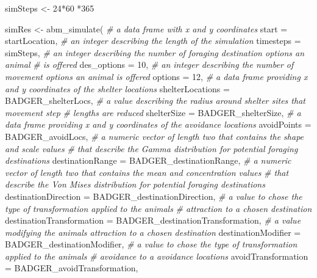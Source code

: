 \documentclass[10pt,a4paper]{article}
\newenvironment{Shaded}{}{}
\newcommand{\AttributeTok}[1]{#1}
\newcommand{\CommentTok}[1]{\textit{#1}}
\newcommand{\DecValTok}[1]{#1}
\newcommand{\FunctionTok}[1]{#1}
\newcommand{\NormalTok}[1]{#1}
\newcommand{\OtherTok}[1]{#1}
\newcommand{\SpecialCharTok}[1]{#1}
\begin{document}
\begin{Shaded}
\begin{Highlighting}[]
\NormalTok{simSteps }\OtherTok{\textless{}{-}} \DecValTok{24}\SpecialCharTok{*}\DecValTok{60} \SpecialCharTok{*}\DecValTok{365}

\NormalTok{simRes }\OtherTok{\textless{}{-}} \FunctionTok{abm\_simulate}\NormalTok{(}
  \CommentTok{\# a data frame with x and y coordinates}
  \AttributeTok{start =}\NormalTok{ startLocation,}
  \CommentTok{\# an integer describing the length of the simulation}
  \AttributeTok{timesteps =}\NormalTok{ simSteps,}
  \CommentTok{\# an integer describing the number of foraging destination options an animal}
  \CommentTok{\# is offered}
  \AttributeTok{des\_options =} \DecValTok{10}\NormalTok{,}
  \CommentTok{\# an integer describing the number of movement options an animal is offered}
  \AttributeTok{options =} \DecValTok{12}\NormalTok{,}
  \CommentTok{\# a data frame providing x and y coordinates of the shelter locations}
  \AttributeTok{shelterLocations =}\NormalTok{ BADGER\_shelterLocs,}
  \CommentTok{\# a value describing the radius around shelter sites that movement step}
  \CommentTok{\# lengths are reduced}
  \AttributeTok{shelterSize =}\NormalTok{ BADGER\_shelterSize,}
  \CommentTok{\# a data frame providing x and y coordinates of the avoidance locations}
  \AttributeTok{avoidPoints =}\NormalTok{ BADGER\_avoidLocs,}
  \CommentTok{\#  a numeric vector of length two that contains the shape and scale values}
  \CommentTok{\#  that describe the Gamma distribution for potential foraging destinations}
  \AttributeTok{destinationRange =}\NormalTok{ BADGER\_destinationRange,}
  \CommentTok{\#  a numeric vector of length two that contains the mean and concentration values}
  \CommentTok{\#  that describe the Von Mises distribution for potential foraging destinations}
  \AttributeTok{destinationDirection =}\NormalTok{ BADGER\_destinationDirection,}
  \CommentTok{\# a value to chose the type of transformation applied to the animal\textquotesingle{}s}
  \CommentTok{\# attraction to a chosen destination}
  \AttributeTok{destinationTransformation =}\NormalTok{ BADGER\_destinationTransformation,}
  \CommentTok{\# a value modifying the animal\textquotesingle{}s attraction to a chosen destination}
  \AttributeTok{destinationModifier =}\NormalTok{ BADGER\_destinationModifier,}
  \CommentTok{\# a value to chose the type of transformation applied to the animal\textquotesingle{}s}
  \CommentTok{\# avoidance to a avoidance locations}
  \AttributeTok{avoidTransformation =}\NormalTok{ BADGER\_avoidTransformation,}

\end{Highlighting}
\end{Shaded}
\end{document}
